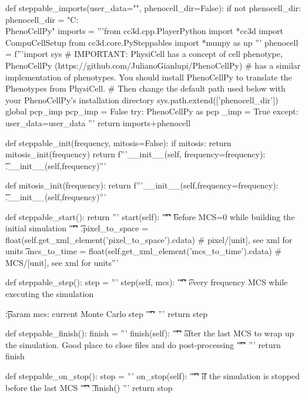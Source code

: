 \begin{python}
def steppable_imports(user_data="", phenocell_dir=False):
    if not phenocell_dir:
        phenocell_dir = "C:\\PhenoCellPy"
    imports = '''from cc3d.cpp.PlayerPython import *\nfrom cc3d import CompuCellSetup
from cc3d.core.PySteppables import *\nimport numpy as np\n
'''
    phenocell = f'''import sys\n
# IMPORTANT: PhysiCell has a concept of cell phenotype, PhenoCellPy (https://github.com/JulianoGianlupi/PhenoCellPy) 
# has a similar implementation of phenotypes. You should install PhenoCellPy to translate the Phenotypes from PhysiCell.
# Then change the default path used below with your PhenoCellPy's installation directory
sys.path.extend(['{phenocell_dir}'])
global pcp_imp
pcp_imp = False
try:
\timport PhenoCellPy as pcp
\tpcp_imp = True
except:
\tpass\n\n
user_data={user_data}\n\n
'''
    return imports+phenocell
\end{python}

\begin{python}
def steppable_init(frequency, mitosis=False):
    if mitosis:
        return mitosis_init(frequency)
    return f'''\n\tdef __init__(self, frequency={frequency}):
\t\tSteppableBasePy.__init__(self,frequency)\n'''
\end{python}

\begin{python}
def mitosis_init(frequency):
    return f'''\n\tdef __init__(self,frequency={frequency}):
\t\tMitosisSteppableBase.__init__(self,frequency)\n'''
\end{python}

\begin{python}
def steppable_start():
    return '''
\tdef start(self):
\t\t"""
\t\tCalled before MCS=0 while building the initial simulation
\t\t"""
\t\tself.pixel_to_space = float(self.get_xml_element('pixel_to_space').cdata)  # pixel/[unit], see xml for units
\t\tself.mcs_to_time = float(self.get_xml_element('mcs_to_time').cdata)  # MCS/[unit], see xml for units'''
\end{python}
\begin{python}
def steppable_step():
    step = '''
\tdef step(self, mcs):
\t\t"""
\t\tCalled every frequency MCS while executing the simulation

\t\t:param mcs: current Monte Carlo step
\t\t"""\n
'''
    return step


def steppable_finish():
    finish = '''
\tdef finish(self):
\t\t"""
\t\tCalled after the last MCS to wrap up the simulation. Good place to close files and do post-processing
\t\t"""\n
'''
    return finish
\end{python}
\begin{python}
def steppable_on_stop():
    stop = '''
\tdef on_stop(self):
\t\t"""
\t\tCalled if the simulation is stopped before the last MCS
\t\t"""
\t\tself.finish()\n
'''
    return stop
\end{python}

